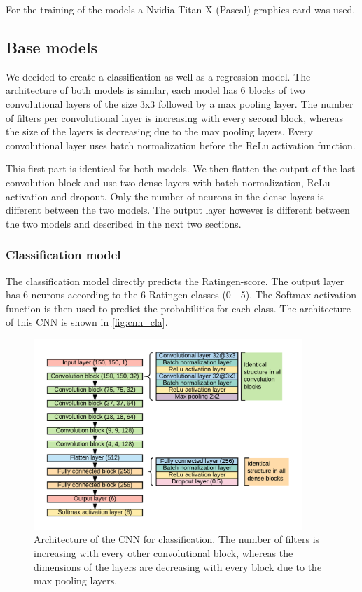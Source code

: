 \documentclass[12pt]{article}
\begin{document}
For the training of the models a Nvidia Titan X (Pascal) graphics card was used.

\subsection{Base models}

We decided to create a classification as well as a regression model. The architecture of both models is similar, each model has 6 blocks of two convolutional layers of the size 3x3 followed by a max pooling layer. The number of filters per convolutional layer is increasing with every second block, whereas the size of the layers is decreasing due to the max pooling layers. Every convolutional layer uses batch normalization before the ReLu activation function.

This first part is identical for both models. We then flatten the output of the last convolution block and use two dense layers with batch normalization, ReLu activation and dropout. Only the number of neurons in the dense layers is different between the two models. The output layer however is different between the two models and described in the next two sections.

\subsubsection{Classification model}
\label{subsubsec:clas}

The classification model directly predicts the Ratingen-score. The output layer has 6 neurons according to the 6 Ratingen classes (0 - 5). The Softmax activation function is then used to predict the probabilities for each class. The architecture of this CNN is shown in \autoref{fig:cnn_cla}.

\begin{figure}[ht]
\includegraphics[width=4in]{cnn_classification}	
\caption{Architecture of the CNN for classification. The number of filters is increasing with every other convolutional block, whereas the dimensions of the layers are decreasing with every block due to the max pooling layers.}
\label{fig:cnn_cla}
\end{figure}
\end{document}
